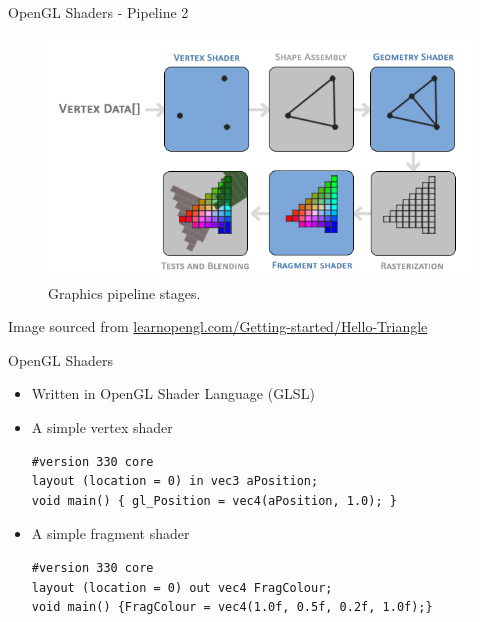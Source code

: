 \documentclass{beamer}
\begin{document}
\begin{frame}{OpenGL Shaders - Pipeline 2}
    \begin{figure}
        \includegraphics{images/pipeline.png}
        \caption{Graphics pipeline stages.}
    \end{figure}
    \vfill{}
    Image sourced from \url{learnopengl.com/Getting-started/Hello-Triangle}
\end{frame}

\begin{frame}[fragile]{OpenGL Shaders}
    \begin{itemize}
        \item Written in OpenGL Shader Language (GLSL)
        \item A simple vertex shader
              \begin{verbatim}
#version 330 core
layout (location = 0) in vec3 aPosition;
void main() { gl_Position = vec4(aPosition, 1.0); }
\end{verbatim}
        \item A simple fragment shader
              \begin{verbatim}
#version 330 core
layout (location = 0) out vec4 FragColour;
void main() {FragColour = vec4(1.0f, 0.5f, 0.2f, 1.0f);}
\end{verbatim}
    \end{itemize}
\end{frame}
\end{document}
